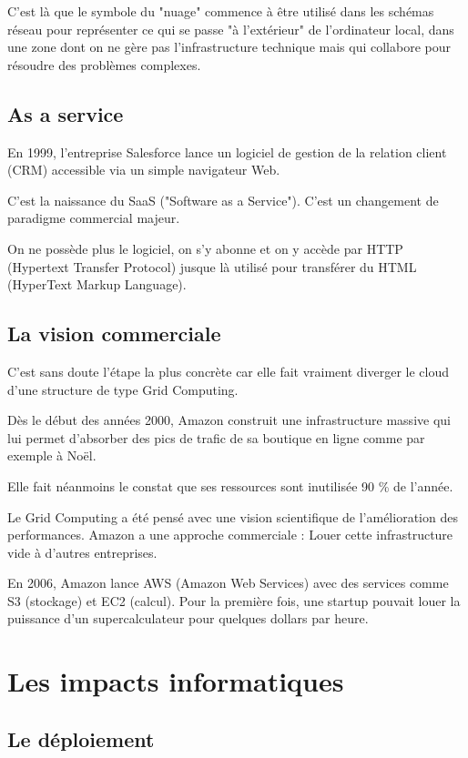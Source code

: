 \documentclass{rapportClass} %
\begin{document}
C’est là que le symbole du "nuage" commence à être utilisé dans les
schémas réseau pour représenter ce qui se passe "à l'extérieur" de
l'ordinateur local, dans une zone dont on ne gère pas l'infrastructure
technique mais qui collabore pour résoudre des problèmes complexes.


\subsection{As a service}

En 1999, l'entreprise Salesforce lance un logiciel de gestion de la
relation client (CRM) accessible via un simple navigateur Web.

C'est la naissance du SaaS ("Software as a Service"). C'est un
changement de paradigme commercial majeur.

On ne possède plus le logiciel, on s'y abonne et on y accède par HTTP
(Hypertext Transfer Protocol) jusque là utilisé pour transférer du
HTML (HyperText Markup Language).

\subsection{La vision commerciale}

C'est sans doute l'étape la plus concrète car elle fait vraiment
diverger le cloud d'une structure de type Grid Computing.

Dès le début des années 2000, Amazon construit une infrastructure
massive qui lui permet d'absorber des pics de trafic de sa
boutique en ligne comme par exemple à Noël.

Elle fait néanmoins le constat que ses ressources sont inutilisée 90
\% de l'année.

Le Grid Computing a été pensé avec une vision scientifique de
l'amélioration des performances. Amazon a une approche commerciale :
Louer cette infrastructure vide à d'autres entreprises.

En 2006, Amazon lance AWS (Amazon Web Services) avec des services
comme S3 (stockage) et EC2 (calcul).  Pour la première fois, une
startup pouvait louer la puissance d'un supercalculateur pour quelques
dollars par heure.


\section{Les impacts informatiques}

\subsection{Le déploiement}
\end{document}
